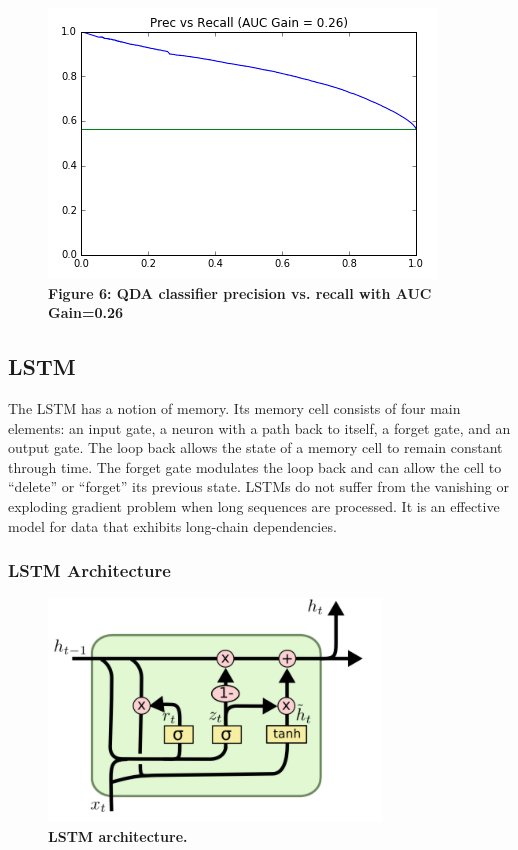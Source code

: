 \documentclass[11pt,a4paper]{article}
\begin{document}
\begin{figure}[H]
	\centering\includegraphics[scale=0.55]{prrc_qda} 
	\caption{\textbf{Figure 6: QDA classifier precision vs. recall with AUC Gain=0.26 }}
\end{figure}


\subsection{LSTM}
The LSTM has a notion of memory. Its memory cell consists of four main elements: an input gate, a neuron with a path back to itself, a forget gate, and an output gate. The loop back allows the state of a memory cell to remain constant through time. The forget gate modulates the loop back and can allow the cell to “delete” or “forget” its previous state. LSTMs do not suffer from the vanishing or exploding gradient problem when long sequences are processed. It is an effective model for data that exhibits long-chain dependencies.  
\subsubsection{LSTM Architecture}
\begin{figure}[H]
	\centering\includegraphics[scale=0.5]{lstm_image} 
	\caption{\textbf{ LSTM architecture.}}
\end{figure}
\end{document}
